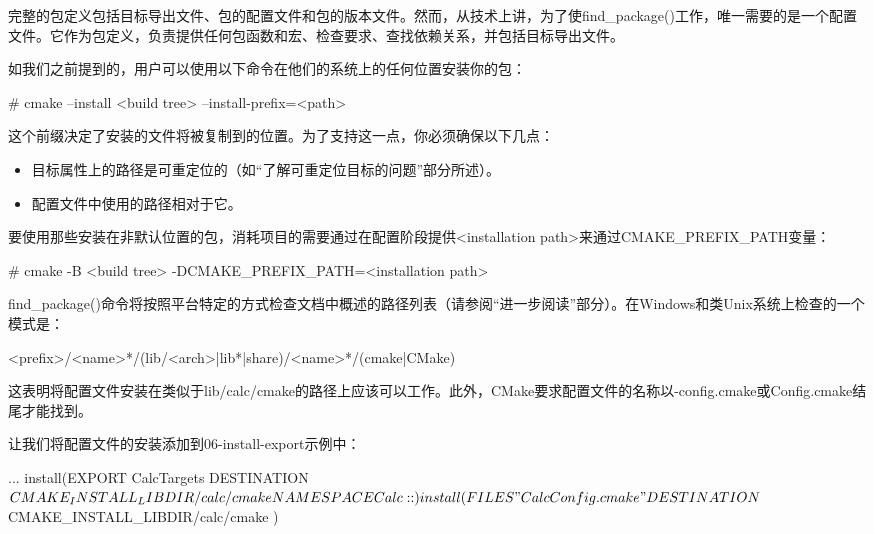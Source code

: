
完整的包定义包括目标导出文件、包的配置文件和包的版本文件。然而，从技术上讲，为了使find\_package()工作，唯一需要的是一个配置文件。它作为包定义，负责提供任何包函数和宏、检查要求、查找依赖关系，并包括目标导出文件。

如我们之前提到的，用户可以使用以下命令在他们的系统上的任何位置安装你的包：

\begin{shell}
# cmake --install <build tree> --install-prefix=<path>
\end{shell}

这个前缀决定了安装的文件将被复制到的位置。为了支持这一点，你必须确保以下几点：

\begin{itemize}
\item
目标属性上的路径是可重定位的（如“了解可重定位目标的问题”部分所述）。

\item
配置文件中使用的路径相对于它。
\end{itemize}

要使用那些安装在非默认位置的包，消耗项目的需要通过在配置阶段提供<installation path>来通过CMAKE\_PREFIX\_PATH变量：

\begin{shell}
# cmake -B <build tree> -DCMAKE_PREFIX_PATH=<installation path>
\end{shell}

find\_package()命令将按照平台特定的方式检查文档中概述的路径列表（请参阅“进一步阅读”部分）。在Windows和类Unix系统上检查的一个模式是：

\begin{shell}
<prefix>/<name>*/(lib/<arch>|lib*|share)/<name>*/(cmake|CMake)
\end{shell}

这表明将配置文件安装在类似于lib/calc/cmake的路径上应该可以工作。此外，CMake要求配置文件的名称以-config.cmake或Config.cmake结尾才能找到。

让我们将配置文件的安装添加到06-install-export示例中：


\begin{cmake}
...
install(EXPORT CalcTargets
    DESTINATION ${CMAKE_INSTALL_LIBDIR}/calc/cmake
    NAMESPACE Calc::
)
install(FILES "CalcConfig.cmake"
    DESTINATION ${CMAKE_INSTALL_LIBDIR}/calc/cmake
)
\end{cmake}


